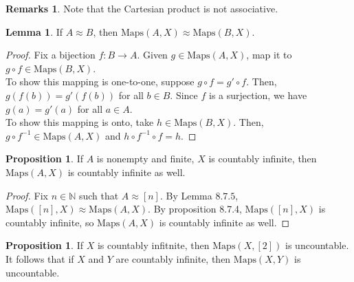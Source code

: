 \documentclass[14pt]{article}
\theoremstyle{definition}
\newtheorem*{remark}{Remarks}
\newtheorem{proposition}[definition]{Proposition}
\newtheorem{lemma}[definition]{Lemma}
\newcommand{\fun}[3]{#1\colon #2\rightarrow#3}
\newcommand{\bb}[1]{\mathbb{#1}}
\begin{document}
\begin{remark}
    Note that the Cartesian product is not associative.
\end{remark}
\vspace{2mm}


\begin{lemma}
   If $A\approx B$, then $\mathrm{Maps}(A,X)\approx \mathrm{Maps}(B,X)$.
\end{lemma}

\begin{proof}
    Fix a bijection $\fun{f}{B}{A}$. Given $g\in \mathrm{Maps}(A,X)$, map it to
    $g\circ f \in\mathrm{Maps}(B,X)$. \\
    To show this mapping is one-to-one, suppose $g\circ f=g'\circ f$. Then, $g(f(b))=g'(f(b))$ for all $b\in 
    B$. Since $f$ is a surjection, we have $g(a)=g'(a)$ for all $a\in A$.\\
    To show this mapping is onto, take $h\in \mathrm{Maps}(B,X)$. Then, $g\circ f^{-1}\in \mathrm{Maps}(A,X)$
     and $h\circ f^{-1}\circ f=h$.

\end{proof}

\vspace{2mm}

\begin{proposition}
    If $A$ is nonempty and finite, $X$ is countably infinite, then $\mathrm{Maps}(A, X)$ is countably infinite as well.
\end{proposition}

\begin{proof}
    Fix $n\in\bb{N}$ such that $A\approx [n]$. By Lemma $8.7.5$, $\mathrm{Maps}([n], X)\approx \mathrm{Maps}(A, X)$.
    By proposition 8.7.4, $\mathrm{Maps}([n], X)$ is countably infinite, so $\mathrm{Maps}(A, X)$ is countably infinite as well.
\end{proof}

\vspace{2mm}


\begin{proposition}
    If $X$ is countably infitnite, then $\mathrm{Maps}(X, [2])$ is uncountable. It follows that if $X$ and $Y$ are countably infinite, then $\mathrm{Maps}(X, Y)$ is uncountable.
\end{proposition}
\end{document}

